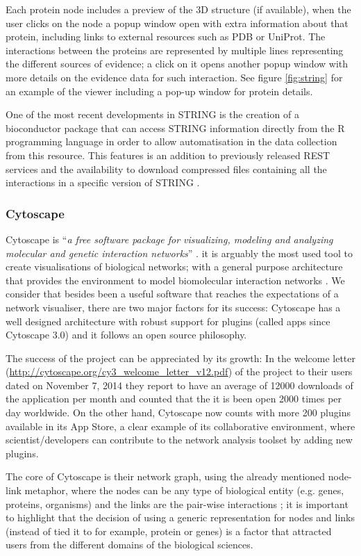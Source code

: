 Each protein node includes a preview of the 3D structure (if available), when the user clicks on the node a popup window open with extra information about that protein, including links to external resources such as PDB or UniProt. The interactions between the proteins are represented by multiple lines representing the different sources of evidence; a click on it opens another popup window with more details on the evidence data for such interaction. See figure \ref{fig:string} for an example of the viewer including a pop-up window for protein details.

One of the most recent developments in STRING is the creation of a bioconductor package that can access STRING information directly from the R programming language in order to allow automatisation in the data collection from this resource. This features is an addition to previously released REST services and the availability to download compressed files containing all the interactions in a specific version of STRING \cite{SZK2014}.

\subsubsection{Cytoscape}
Cytoscape is ``\emph{a free software package for visualizing, modeling and analyzing molecular and genetic interaction networks}'' \cite{CLI2007}. it is arguably the most used tool to create visualisations of biological networks; with a general purpose architecture that provides the environment to model biomolecular interaction networks . We consider that besides been a useful software that reaches the expectations of a network visualiser, there are two major factors for its success: Cytoscape has a well designed architecture with robust support for plugins (called apps since Cytoscape 3.0) and it follows an open source philosophy.

The success of the project can be appreciated by its growth: In the welcome letter (\url{http://cytoscape.org/cy3_welcome_letter_v12.pdf}) of the project to their users dated on November 7, 2014 they report to have an average of 12000 downloads of the application per month and counted that the it is been open 2000 times per day worldwide. On the other hand, Cytoscape now counts with more 200 plugins available in its App Store, a clear example of its collaborative environment, where scientist/developers can contribute to the network analysis toolset by adding new plugins.

The core of Cytoscape is their network graph, using the already mentioned node-link metaphor, where the nodes can be any type of biological entity (e.g. genes, proteins, organisms) and the links are the pair-wise interactions \cite{SHA2003}; it is important to highlight that the decision of using a generic representation for nodes and links (instead of tied it to for example, protein or genes) is a factor that attracted users from the different domains of the biological sciences.

